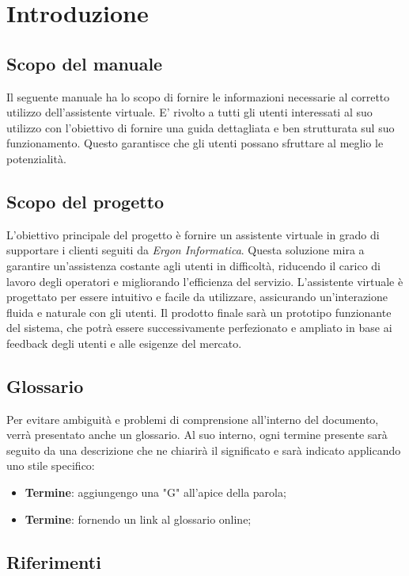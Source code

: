 \section{Introduzione}

\subsection{Scopo del manuale}
Il seguente manuale ha lo scopo di fornire le informazioni necessarie al corretto utilizzo dell'assistente virtuale. E' rivolto a tutti gli utenti interessati al suo utilizzo con l'obiettivo di fornire una guida dettagliata e ben strutturata sul suo funzionamento. Questo garantisce che gli utenti possano sfruttare al meglio le potenzialità.

\subsection{Scopo del progetto}
L'obiettivo principale del progetto è fornire un assistente virtuale in grado di supportare i clienti seguiti da \textit{Ergon Informatica}. Questa soluzione mira a garantire un'assistenza costante agli utenti in difficoltà, riducendo il carico di lavoro degli operatori e migliorando l'efficienza del servizio. L'assistente virtuale è progettato per essere intuitivo e facile da utilizzare, assicurando un'interazione fluida e naturale con gli utenti. Il prodotto finale sarà un prototipo funzionante del sistema, che potrà essere successivamente perfezionato e ampliato in base ai feedback degli utenti e alle esigenze del mercato.

\subsection{Glossario}
Per evitare ambiguità e problemi di comprensione all'interno del documento, verrà presentato anche un glossario. Al suo interno, ogni termine presente sarà seguito da una descrizione che ne chiarirà il significato e sarà indicato applicando uno stile specifico:
\begin{itemize}
    \item \textbf{Termine}: aggiungengo una "G" all'apice della parola;
    \item \textbf{Termine}: fornendo un link al glossario online;
\end{itemize}

\subsection{Riferimenti}
